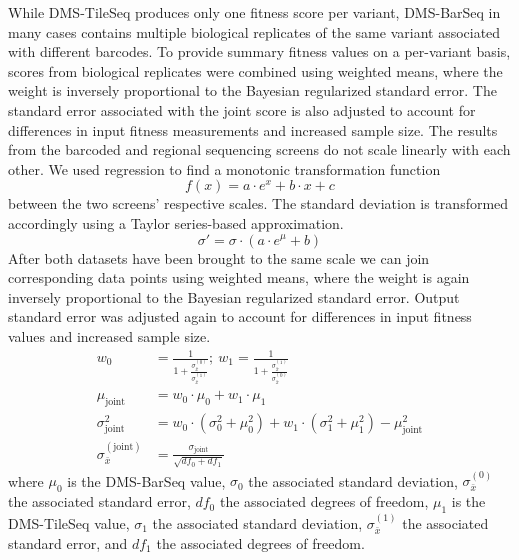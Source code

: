 While DMS-TileSeq produces only one fitness score per variant, DMS-BarSeq in many cases contains multiple biological replicates of the same variant associated with different barcodes. To provide summary fitness values on a per-variant basis, scores from biological replicates were combined using weighted means, where the weight is inversely proportional to the Bayesian regularized standard error. The standard error associated with the joint score is also adjusted to account for differences in input fitness measurements and increased sample size.
The results from the barcoded and regional sequencing screens do not scale linearly with each other. We used regression to find a monotonic transformation function $$f(x) = a \cdot e^x + b \cdot x + c$$ between the two screens' respective scales. The standard deviation is transformed accordingly using a Taylor series-based approximation. $$ \sigma' = \sigma \cdot (a\cdot e^{\mu} + b)  $$ After both datasets have been brought to the same scale we can join corresponding data points using weighted means, where the weight is again inversely proportional to the Bayesian regularized standard error. Output standard error was adjusted again to account for differences in input fitness values and increased sample size. 
\begin{align*}
w_0 &= \frac{1}{1+\frac{\sigma_{\bar x}^{(0)}}{\sigma_{\bar x}^{(1)}}}; ~ w_1 = \frac{1}{1+\frac{\sigma_{\bar x}^{(1)}}{\sigma_{\bar x}^{(0)}}}\\
\mu_\text{joint} &= w_0 \cdot \mu_0 + w_1 \cdot \mu_1\\
\sigma_\text{joint}^2 &= w_0 \cdot (\sigma_0^2 + \mu_0^2) + w_1 \cdot (\sigma_1^2 + \mu_1^2) - \mu_\text{joint}^2\\
\sigma_{\bar x}^{(\text{joint})} &= \frac{\sigma_\text{joint}}{\sqrt{df_0 + df_1}}
\end{align*}
where $\mu_0$ is the DMS-BarSeq value, $\sigma_0$ the associated standard deviation, $\sigma_{\bar x}^{(0)}$ the associated standard error, $df_0$ the associated degrees of freedom, $\mu_1$ is the DMS-TileSeq value, $\sigma_1$ the associated standard deviation, $\sigma_{\bar x}^{(1)}$ the associated standard error, and $df_1$ the associated degrees of freedom.

